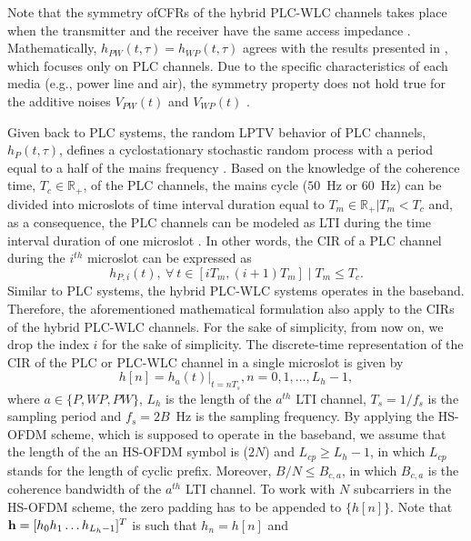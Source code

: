 \documentclass[journal]{IEEEtran}
\begin{document}
Note that the symmetry of\acp{CFR} of the hybrid \ac{PLC}-\ac{WLC}  channels takes place when the transmitter and the receiver have the same access impedance \cite{thiago:hyb}. Mathematically, $h_{PW}(t,\tau)=h_{WP}(t,\tau)$ agrees with the results presented in \cite{Galli:indoor}, which focuses only on \ac{PLC} channels. Due to the specific characteristics of each media (e.g., power line and air), the symmetry property does not hold true for the additive noises $V_{PW}(t)$ and $V_{WP}(t)$ \cite{thiago:hyb}. 

Given back to \ac{PLC} systems, the random \ac{LPTV} behavior of \ac{PLC} channels, $h_P(t,\tau)$, defines a cyclostationary stochastic random process with a period equal to a half of the mains frequency \cite{Colen:TCRA}. Based on the knowledge of the coherence time, $T_c \in \mathbb{R}_+$, of the \ac{PLC} channels, the mains cycle ($50$~Hz or $60$~Hz) can be divided into microslots of time interval duration equal to $T_m\in \mathbb{R}_+|T_m < T_c$ and, as a consequence, the \ac{PLC} channels can be modeled as \ac{LTI} during the time interval duration of one microslot \cite{Colen2016}. In other words, the \ac{CIR} of a \ac{PLC} channel during the $i^{th}$ microslot can be expressed as
\begin{equation} \label{discreteh}
h_{P,i}(t),~\forall~t \in [iT_{m}, (i+1)T_{m}] \mid T_{m} \le T_{c}.
\end{equation}
Similar to \ac{PLC} systems, the hybrid \ac{PLC}-\ac{WLC} systems operates in the baseband. Therefore, the aforementioned mathematical formulation also apply to the \acp{CIR} of the hybrid \ac{PLC}-\ac{WLC} channels. For the sake of simplicity, from now on, we drop the index $i$ for the sake of simplicity. The discrete-time representation of the \ac{CIR} of the \ac{PLC} or \ac{PLC}-\ac{WLC} channel in a single microslot is given by
\begin{equation} \label{discreteCFR}
h[n] = h_{a}(t)|_{t=nT_s} , n = 0,1, \ldots, L_h-1, 
\end{equation}
where $a\in \{P, WP, PW \}$, $L_{h}$ is the length of the $a^{th}$ \ac{LTI} channel, $T_s=1/f_s$ is the sampling period and $f_s=2B$~Hz is the sampling frequency. By applying the \ac{HS-OFDM} scheme, which is supposed to operate in the baseband, we assume that the length of the an \ac{HS-OFDM} symbol is ($2N$) and $L_{cp} \geq L_h-1$, in which $L_{cp}$ stands for the length of cyclic prefix. Moreover, $B/N \le B_{c,a}$, in which $B_{c,a}$ is the coherence bandwidth of the $a^{th}$ \ac{LTI} channel. To work with $N$ subcarriers in the \ac{HS-OFDM} scheme, the zero padding has to be appended to $\{h[n]\}$. Note that ${\bf h}=[h_0 h_1 \ldots h_{L_h-1}]^T$ is such that $h_n=h[n]$ and 
\end{document}
